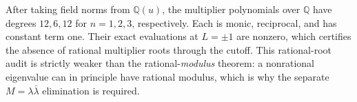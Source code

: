 \documentclass[11pt]{article}
\theoremstyle{definition}
\theoremstyle{remark}
\newcommand{\Q}{\mathbb Q}
\begin{document}
After taking field norms from $\Q(u)$, the multiplier polynomials over $\Q$
have degrees $12,6,12$ for $n=1,2,3$, respectively.  Each is monic,
reciprocal, and has constant term one.  Their exact evaluations at $L=\pm1$
are nonzero, which certifies the absence of rational multiplier roots through
the cutoff.  This rational-root audit is strictly weaker than the
rational-\emph{modulus} theorem: a nonrational eigenvalue can in principle
have rational modulus, which is why the separate $M=\lambda\bar\lambda$
elimination is required.



\end{document}
